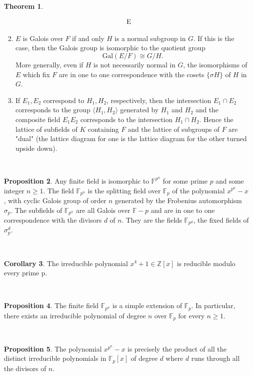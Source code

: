 \documentclass{article}
\theoremstyle{definition}
\newtheorem{thm}{Theorem}[section]
\newtheorem{prop}[thm]{Proposition}
\newtheorem{cor}[thm]{Corollary}
\newcommand{\nl}{\textcolor{white}{nothing}}
\newcommand{\Z}{\mathbb{Z}}
\newcommand{\F}{\mathbb{F}}
\newcommand{\sig}{\sigma}
\newcommand{\Gal}{\text{Gal}}
\begin{document}
\begin{thm}
\begin{enumerate}
\[\begin{tabular}{cc}
E & 
\end{tabular}\]
\item $E$ is Galois over $F$ if and only $H$ is a normal subgroup in $G$. If this is the case, then the Galois group is isomorphic to the quotient group 
\[\Gal(E/F)\cong G/H.\]
More generally, even if $H$ is not necessarily normal in $G$, the isomorphisms of $E$ which fix $F$ are in one to one correspondence with the cosets $\{\sig H\}$ of $H$ in $G$.
\item If $E_1, E_2$ correspond to $H_1, H_2$, respectively, then the intersection $E_1\cap E_2$ corresponds to the group $\langle H_1, H_2\rangle$ generated by $H_1$ and $H_2$ and the composite field $E_1E_2$ corresponds to the intersection $H_1\cap H_2$. Hence the lattice of subfields of $K$ containing $F$ and the lattice of subgroups of $F$ are "dual" (the lattice diagram for one is the lattice diagram for the other turned upside down).
\end{enumerate}
\end{thm}

\nl

\begin{prop}
Any finite field is isomorphic to $\F^{p^n}$ for some prime $p$ and some integer $n\geq 1$. The field $\F_{p^n}$ is the splitting field over $\F_p$ of the polynomial $x^{p^n} - x$, with cyclic Galois group of order $n$ generated by the Frobenius automorphism $\sig_p$. The subfields of $\F_{p^n}$ are all Galois over $\F-p$ and are in one to one correspondence with the divisors $d$ of $n$. They are the fields $\F_{p^d}$, the fixed fields of $\sig_p^d$.
\end{prop}

\nl

\begin{cor}
The irreducible polynomial $x^4 + 1\in \Z[x]$ is reducible modulo every prime p.
\end{cor}

\nl

\begin{prop}
The finite field $\F_{p^n}$ is a simple extension of $\F_p$. In particular, there exists an irreducible polynomial of degree $n$ over $\F_p$ for every $n\geq 1$.
\end{prop}

\nl

\begin{prop}
The polynomial $x^{p^n} - x$ is precisely the product of all the distinct irreducible polynomials in $\F_p[x]$ of degree $d$ where $d$ runs through all the divisors of $n$.
\end{prop}
\end{document}
